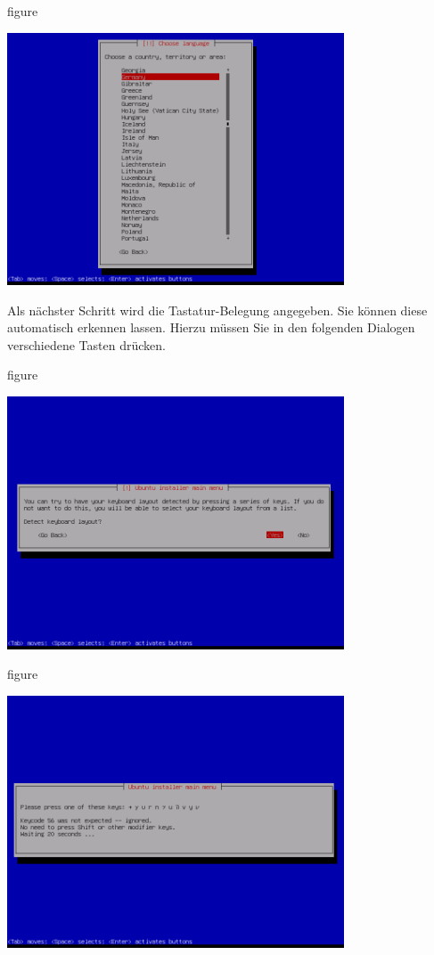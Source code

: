 \begin{nofloat}{figure}
\begin{center}
\includegraphics[width=0.75\textwidth]{screenshots/05_ubuntu_install.png}
\end{center}
\end{nofloat}

Als nächster Schritt wird die Tastatur-Belegung angegeben. Sie können diese automatisch erkennen lassen. Hierzu müssen Sie in
den folgenden Dialogen verschiedene Tasten drücken.

\begin{nofloat}{figure}
\begin{center}
\includegraphics[width=0.75\textwidth]{screenshots/06_ubuntu_install.png}
\end{center}
\end{nofloat}

\begin{nofloat}{figure}
\begin{center}
\includegraphics[width=0.75\textwidth]{screenshots/07_ubuntu_install.png}
\end{center}
\end{nofloat}

